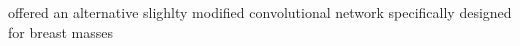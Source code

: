 \begin{comment} Lo2002
- Decide which are the important ones from them an heang pincg chan and that. 
\end{comment}
\cite{Lo2002} offered an alternative slighlty modified convolutional network specifically designed for breast masses





\begin{comment} 

Two teams (search for more papers from them)
Georgetown University Medical Center: Shih-Chung Lo, Matthew Freedman, Huai Li
Michigan Medical Center: Heang-Ping Chan, Sahiner, Hadjiiski, Helvie


1995 (and Michigan), 1998, 2002 Georgetown
1996, 2002 (Optimal Neu...), 2007 Michigan
2014 cruz-roa (Not on x-Ray with pooling)

(clusters ) GM95, G98, 
(masses) M96, G02
(clusters) M02, M07

2013 breast cancer diagnosis a review or other good review.
Work at Tec.
\end{comment}
